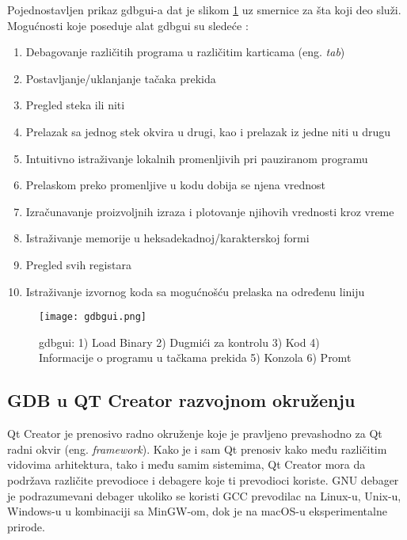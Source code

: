 \documentclass[a4paper]{article}
\begin{document}
Pojednostavljen prikaz gdbgui-a dat je slikom \ref{fig:gdbgui} uz smernice za šta koji deo služi.
Mogućnosti koje poseduje alat gdbgui su sledeće \cite{n0where}: 
\begin{enumerate}
\item Debagovanje različitih programa u različitim karticama (eng. \textit{tab})
\item Postavljanje/uklanjanje tačaka prekida
\item Pregled steka ili niti
\item Prelazak sa jednog stek okvira u drugi, kao i prelazak iz jedne niti u drugu
\item Intuitivno istraživanje lokalnih promenljivih pri pauziranom programu
\item Prelaskom preko promenljive u kodu dobija se njena vrednost
\item Izračunavanje proizvoljnih izraza i plotovanje njihovih vrednosti kroz vreme
\item Istraživanje memorije u heksadekadnoj/karakterskoj formi
\item Pregled svih registara
\item Istraživanje izvornog koda sa mogućnošću prelaska na određenu liniju
\end{enumerate}



\begin{figure}[h!]
\begin{center}
\texttt{[image: gdbgui.png]}
\end{center}
\caption{gdbgui: 1) Load Binary 2) Dugmići za kontrolu 3) Kod 4) Informacije o programu u tačkama prekida 5) Konzola 6) Promt}
\label{fig:gdbgui}
\end{figure}

\subsection{GDB u QT Creator razvojnom okruženju}
\label{subsec:QT}

Qt Creator je prenosivo radno okruženje koje je pravljeno prevashodno za Qt radni okvir (eng. \textit{framework}).
Kako je i sam Qt prenosiv kako među različitim vidovima arhitektura, tako i među samim sistemima, Qt Creator
mora da podržava različite prevodioce i debagere koje ti prevodioci koriste. GNU debager je podrazumevani debager
ukoliko se koristi GCC prevodilac na Linux-u, Unix-u, Windows-u u kombinaciji sa MinGW-om, dok je na macOS-u
eksperimentalne prirode\cite{QT}. 
\end{document}
